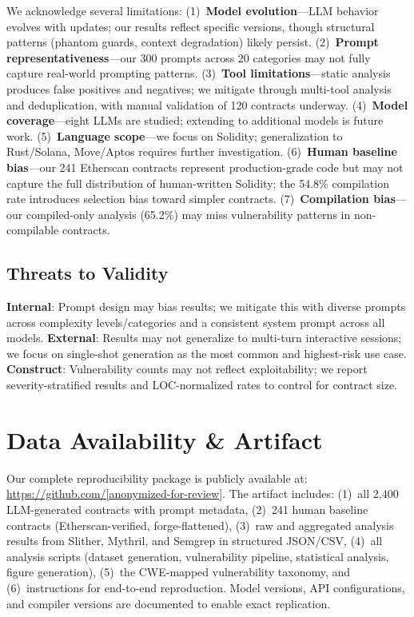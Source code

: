 We acknowledge several limitations: (1)~\textbf{Model evolution}---LLM behavior evolves with updates; our results reflect specific versions, though structural patterns (phantom guards, context degradation) likely persist. (2)~\textbf{Prompt representativeness}---our 300 prompts across 20 categories may not fully capture real-world prompting patterns. (3)~\textbf{Tool limitations}---static analysis produces false positives and negatives; we mitigate through multi-tool analysis and deduplication, with manual validation of 120 contracts underway. (4)~\textbf{Model coverage}---eight LLMs are studied; extending to additional models is future work. (5)~\textbf{Language scope}---we focus on Solidity; generalization to Rust/Solana, Move/Aptos requires further investigation. (6)~\textbf{Human baseline bias}---our 241 Etherscan contracts represent production-grade code but may not capture the full distribution of human-written Solidity; the 54.8\% compilation rate introduces selection bias toward simpler contracts. (7)~\textbf{Compilation bias}---our compiled-only analysis (65.2\%) may miss vulnerability patterns in non-compilable contracts.

\subsection{Threats to Validity}

\textbf{Internal}: Prompt design may bias results; we mitigate this with diverse prompts across complexity levels/categories and a consistent system prompt across all models. \textbf{External}: Results may not generalize to multi-turn interactive sessions; we focus on single-shot generation as the most common and highest-risk use case. \textbf{Construct}: Vulnerability counts may not reflect exploitability; we report severity-stratified results and LOC-normalized rates to control for contract size.

\section*{Data Availability \& Artifact}

Our complete reproducibility package is publicly available at: \url{https://github.com/[anonymized-for-review]}. The artifact includes: (1)~all 2,400 LLM-generated contracts with prompt metadata, (2)~241 human baseline contracts (Etherscan-verified, forge-flattened), (3)~raw and aggregated analysis results from Slither, Mythril, and Semgrep in structured JSON/CSV, (4)~all analysis scripts (dataset generation, vulnerability pipeline, statistical analysis, figure generation), (5)~the CWE-mapped vulnerability taxonomy, and (6)~instructions for end-to-end reproduction. Model versions, API configurations, and compiler versions are documented to enable exact replication.

